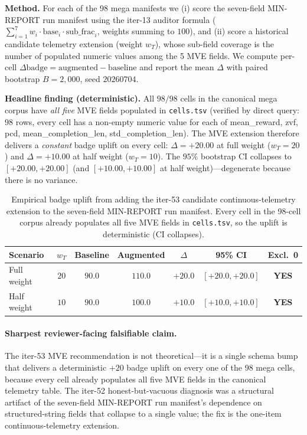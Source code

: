 \documentclass{article}  \usepackage[preprint,nonatbib]{neurips_2026} \usepackage[numbers]{natbib}
\begin{document}
\textbf{Method.} For each of the 98 mega manifests we (i) score the
seven-field MIN-REPORT run manifest using the iter-13 auditor formula
($\sum_{i=1}^{7} w_i \cdot \mathrm{base}_i \cdot \mathrm{sub\_frac}_i$,
weights summing to $100$), and (ii) score a historical candidate
telemetry extension (weight $w_T$), whose
sub-field coverage is the number of populated numeric values among
the 5 MVE fields. We compute per-cell $\Delta\mathrm{badge} =
\mathrm{augmented} - \mathrm{baseline}$ and report the mean $\Delta$
with paired bootstrap $B{=}2{,}000$, seed $20260704$.

\textbf{Headline finding (deterministic).} All $98/98$ cells in the
canonical mega corpus have \emph{all five} MVE fields populated in
\texttt{cells.tsv} (verified by direct query: $98$ rows, every cell
has a non-empty numeric value for each of mean\_reward, zvf, pcd,
mean\_completion\_len, std\_completion\_len). The MVE extension
therefore delivers a \emph{constant} badge uplift on every cell:
$\Delta = +20.00$ at full weight ($w_T = 20$) and
$\Delta = +10.00$ at half weight ($w_T = 10$). The $95\%$ bootstrap CI
collapses to $[+20.00, +20.00]$ (and $[+10.00, +10.00]$ at half
weight)---degenerate because there is no variance.

\begin{table}[t]
\centering
\small
\caption{Empirical badge uplift from adding the iter-53 candidate
continuous-telemetry extension to the seven-field MIN-REPORT run manifest.
Every cell in
the 98-cell corpus already populates all five MVE fields in
\texttt{cells.tsv}, so the uplift is deterministic (CI collapses).}
\label{tab:p5-mve-empirical}
\begin{tabular}{lcccccc}
\toprule
Scenario & $w_T$ & Baseline & Augmented & $\Delta$ & 95\% CI & Excl.\ 0 \\
\midrule
Full weight  & $20$ & $90.0$ & $110.0$ & $+20.0$ & $[+20.0, +20.0]$ & \textbf{YES} \\
Half weight  & $10$ & $90.0$ & $100.0$ & $+10.0$ & $[+10.0, +10.0]$ & \textbf{YES} \\
\bottomrule
\end{tabular}
\end{table}

\paragraph{Sharpest reviewer-facing falsifiable claim.}
The iter-53 MVE recommendation is not theoretical---it is a single
schema bump that delivers a deterministic $+20$ badge uplift on every
one of the 98 mega cells, because every cell already populates all
five MVE fields in the canonical telemetry table. The
iter-52 honest-but-vacuous diagnosis was a structural artifact of
the seven-field MIN-REPORT run manifest's dependence on structured-string fields that
collapse to a single value; the fix is the one-item continuous-telemetry
extension.
\end{document}
